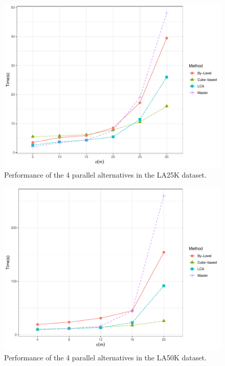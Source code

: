 \begin{figure}
    \centering
    \includegraphics[width=0.75\linewidth]{chapter4/figures/plots/08_sequential_parallel/la25k_e}
    \caption{Performance of the 4 parallel alternatives in the LA25K dataset.}\label{fig:la25k_e}
\end{figure}

\begin{figure}
    \centering
    \includegraphics[width=0.75\linewidth]{chapter4/figures/plots/08_sequential_parallel/la50k_e}
    \caption{Performance of the 4 parallel alternatives in the LA50K dataset.}\label{fig:la50k_e}
\end{figure}
